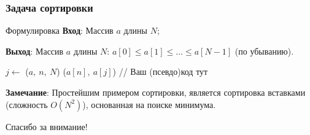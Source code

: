 \documentclass{beamer}
\begin{document}
    \begin{frame}[fragile]
        \frametitle{Задача сортировки}
        \begin{block}{Формулировка}
            \justifying
            {\bf Вход}: Массив $a$ длины $N$;
            \par
            {\bf Выход}: Массив $a$ длины $N$: $a[0] \leq a[1] \leq \dotsc \leq a[N - 1]$ (по убыванию).
        \end{block}
        \par
        \begin{algorithm}[H]
            \DontPrintSemicolon

            {
                {
                    $j \leftarrow$ \FMinIndex($a,\ n,\ N$)\;
                    \FSwap($a[n],\ a[j]$)\;
                }
            }
            \;
            {
                // Ваш (псевдо)код тут
            }
            \;
        \end{algorithm}
        \justifying
        \par
        {\bf Замечание}: Простейшим примером сортировки, является сортировка вставками (сложность $O(N^{2})$), основанная на поиске минимума.
    \end{frame}
    \begin{frame}
        \begin{center}
        \baselineskip 20.0mm
        \Huge Спасибо за внимание!
        \end{center}
    \end{frame}
\end{document}
